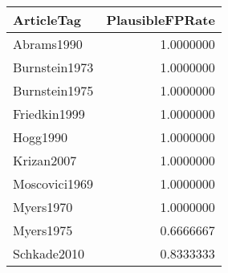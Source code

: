 
\begin{tabular}{lr}
\toprule
ArticleTag & PlausibleFPRate\\
\midrule
Abrams1990 & 1.0000000\\
Burnstein1973 & 1.0000000\\
Burnstein1975 & 1.0000000\\
Friedkin1999 & 1.0000000\\
Hogg1990 & 1.0000000\\
\addlinespace
Krizan2007 & 1.0000000\\
Moscovici1969 & 1.0000000\\
Myers1970 & 1.0000000\\
Myers1975 & 0.6666667\\
Schkade2010 & 0.8333333\\
\bottomrule
\end{tabular}
